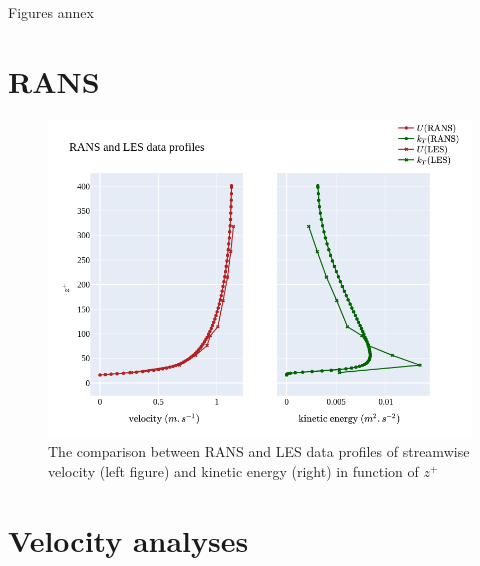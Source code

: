 \documentclass[]{article}
\theoremstyle{plain}
\theoremstyle{remark}
\begin{document}
\begin{center} 
	\huge Figures annex
\end{center}

\section{RANS}

\begin{figure}[h]
	\begin{center}
	\includegraphics[width=\textwidth]{../output/RANS/RANS_profiles.png}
	\caption{The comparison between RANS and LES data profiles of streamwise velocity (left figure) and kinetic energy (right) in function of $z^+$}
	\end{center}
\end{figure}



\section{Velocity analyses}
\end{document}
